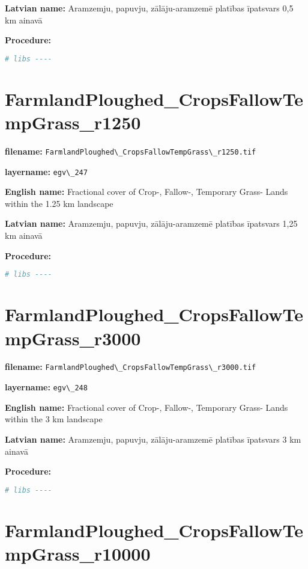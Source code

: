 \documentclass[
]{book}
\newcommand{\passthrough}[1]{#1}
\begin{document}
\textbf{Latvian name:} Aramzemju, papuvju, zālāju-aramzemē platības īpatsvars 0,5 km ainavā

\textbf{Procedure:}

\begin{lstlisting}[language=R]
# libs ----
\end{lstlisting}

\section{FarmlandPloughed\_CropsFallowTempGrass\_r1250}\label{ch06.247}

\textbf{filename:} \passthrough{\lstinline!FarmlandPloughed\_CropsFallowTempGrass\_r1250.tif!}

\textbf{layername:} \passthrough{\lstinline!egv\_247!}

\textbf{English name:} Fractional cover of Crop-, Fallow-, Temporary Grass- Lands within the 1.25 km landscape

\textbf{Latvian name:} Aramzemju, papuvju, zālāju-aramzemē platības īpatsvars 1,25 km ainavā

\textbf{Procedure:}

\begin{lstlisting}[language=R]
# libs ----
\end{lstlisting}

\section{FarmlandPloughed\_CropsFallowTempGrass\_r3000}\label{ch06.248}

\textbf{filename:} \passthrough{\lstinline!FarmlandPloughed\_CropsFallowTempGrass\_r3000.tif!}

\textbf{layername:} \passthrough{\lstinline!egv\_248!}

\textbf{English name:} Fractional cover of Crop-, Fallow-, Temporary Grass- Lands within the 3 km landscape

\textbf{Latvian name:} Aramzemju, papuvju, zālāju-aramzemē platības īpatsvars 3 km ainavā

\textbf{Procedure:}

\begin{lstlisting}[language=R]
# libs ----
\end{lstlisting}

\section{FarmlandPloughed\_CropsFallowTempGrass\_r10000}\label{ch06.249}
\end{document}
